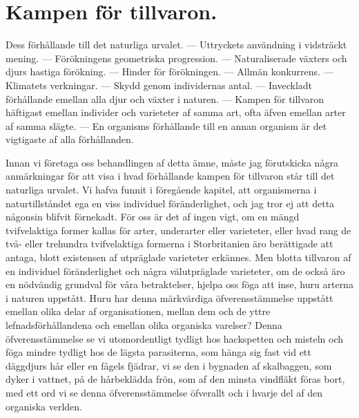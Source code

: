 

\chapter{Kampen för tillvaron.}

Dess förhållande till det naturliga urvalet. — Uttryckets användning i vidsträckt mening. — Förökningens geometriska progression. — Naturaliserade växters och djurs hastiga förökning. — Hinder för förökningen. — Allmän konkurrens. — Klimatets verkningar. — Skydd genom individernas antal. — Inveckladt förhållande emellan alla djur och växter i naturen. — Kampen för tillvaron häftigast emellan individer och varieteter af samma art, ofta äfven emellan arter af samma slägte. — En organisms förhållande till en annan organism är det vigtigaste af alla förhållanden.


Innan vi företaga oss behandlingen af detta ämne, måste jag förutskicka några anmärkningar för att visa i hvad förhållande kampen för tillvaron står till det naturliga urvalet. Vi hafva funnit i föregående kapitel, att organismerna i naturtillståndet ega en viss individuel föränderlighet, och jag tror ej att detta någonsin blifvit förnekadt. För oss är det af ingen vigt, om en mängd tvifvelaktiga former kallas för arter, underarter eller varieteter, eller hvad rang de två- eller trehundra tvifvelaktiga formerna i Storbritanien äro berättigade att antaga, blott existensen af utpräglade varieteter erkännes. Men blotta tillvaron af en individuel föränderlighet och några välutpräglade varieteter, om de också äro en nödvändig grundval för våra betraktelser, hjelpa oss föga att inse, huru arterna i naturen uppstått. Huru har denna märkvärdiga öfverensstämmelse uppstått emellan olika delar af organisationen, mellan dem och de yttre lefnadsförhållandena och emellan olika organiska varelser? Denna öfverensstämmelse se vi utomordentligt tydligt hos hackspetten och misteln och föga mindre tydligt hos de lägsta parasiterna, som hänga sig fast vid ett däggdjurs hår eller en fågels fjädrar, vi se den i bygnaden af skalbaggen, som dyker i vattnet, på de hårbeklädda frön, som af den minsta vindfläkt föras bort, med ett ord vi se denna öfverensstämmelse öfverallt och i hvarje del af den organiska verlden.


